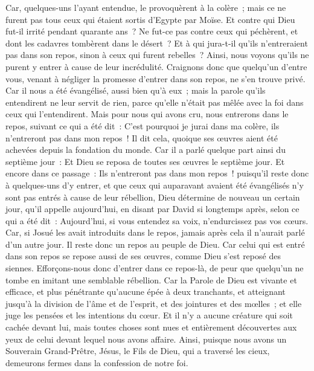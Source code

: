 \begin{multicols}{2}
Car, quelques-uns l'ayant entendue, le provoquèrent à la colère~; mais ce ne furent pas tous ceux qui étaient sortis d'Egypte par Moïse.
Et contre qui Dieu fut-il irrité pendant quarante ans~? Ne fut-ce pas contre ceux qui péchèrent, et dont les cadavres tombèrent dans le désert~?
Et à qui jura-t-il qu'ils n'entreraient pas dans son repos, sinon à ceux qui furent rebelles~?
Ainsi, nous voyons qu'ils ne purent y entrer à cause de leur incrédulité.
\VerseOne{}Craignons donc que quelqu'un d'entre vous, venant à négliger la promesse d'entrer dans son repos, ne s'en trouve privé.
Car il nous a été évangélisé, aussi bien qu'à eux~; mais la parole qu'ils entendirent ne leur servit de rien, parce qu'elle n'était pas mêlée avec la foi dans ceux qui l'entendirent.
Mais pour nous qui avons cru, nous entrerons dans le repos, suivant ce qui a été dit~: C'est pourquoi je jurai dans ma colère, ils n'entreront pas dans mon repos~! Il dit cela, quoique ses œuvres aient été achevées depuis la fondation du monde.
Car il a parlé quelque part ainsi du septième jour~: Et Dieu se reposa de toutes ses œuvres le septième jour.
Et encore dans ce passage~: Ils n'entreront pas dans mon repos~!
puisqu'il reste donc à quelques-uns d'y entrer, et que ceux qui auparavant avaient été évangélisés n'y sont pas entrés à cause de leur rébellion,
Dieu détermine de nouveau un certain jour, qu'il appelle aujourd'hui, en disant par David si longtemps après, selon ce qui a été dit~: Aujourd'hui, si vous entendez sa voix, n'endurcissez pas vos cœurs.
Car, si Josué les avait introduits dans le repos, jamais après cela il n'aurait parlé d'un autre jour.
Il reste donc un repos au peuple de Dieu.
Car celui qui est entré dans son repos se repose aussi de ses œuvres, comme Dieu s'est reposé des siennes.
Efforçons-nous donc d'entrer dans ce repos-là, de peur que quelqu'un ne tombe en imitant une semblable rébellion.
Car la Parole de Dieu est vivante et efficace, et plus pénétrante qu'aucune épée à deux tranchants, et atteignant jusqu'à la division de l'âme et de l'esprit, et des jointures et des mœlles~; et elle juge les pensées et les intentions du cœur.
Et il n'y a aucune créature qui soit cachée devant lui, mais toutes choses sont nues et entièrement découvertes aux yeux de celui devant lequel nous avons affaire.
Ainsi, puisque nous avons un Souverain Grand-Prêtre, Jésus, le Fils de Dieu, qui a traversé les cieux, demeurons fermes dans la confession de notre foi.

\end{multicols}
